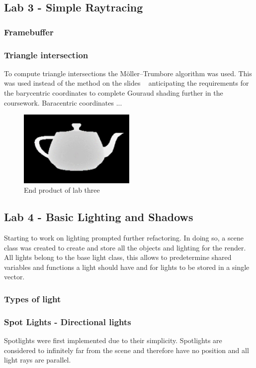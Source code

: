 \documentclass{article}
\begin{document}
\subsection{Lab 3 - Simple Raytracing}
\subsubsection{Framebuffer}

\subsubsection{Triangle intersection}
To compute triangle intersections the Möller–Trumbore algorithm was used. This was used instead of the method on the slides ~\cite{ref:lec04} anticipating the requirements for the barycentric coordinates to complete Gouraud shading further in the coursework. Baracentric coordinates ...

\begin{figure}[h]
\centering
\includegraphics[width=0.5\textwidth]{depthmap}
\captionsetup{justification=centering,margin=0.5cm}
\caption{End product of lab three}
\label{fig:depthmap}
\end{figure}

\subsection{Lab 4 - Basic Lighting and Shadows}
Starting to work on lighting prompted further refactoring. In doing so, a scene class was created to create and store all the objects and lighting for the render. All lights belong to the base light class, this allows to predetermine shared variables and functions a light should have and for lights to be stored in a single vector.
\subsubsection{Types of light}
\subsubsection{Spot Lights - Directional lights}
Spotlights were first implemented due to their simplicity. Spotlights are considered to infinitely far from the scene and therefore have no position and all light rays are parallel.
\end{document}
